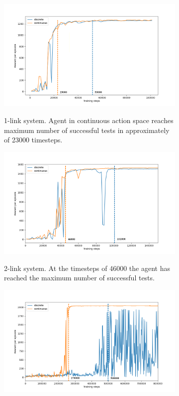 \begin{figure}[h!]
	\centering
	\begin{subfigure}[t]{0.48\textwidth}
		\centering
		\includegraphics[width=\textwidth]{Figures/SP_discrete_vs_continuous_training_time.png}
		\label{fig: sp - training time}
		\caption{1-link system. Agent in continuous action space reaches maximum number of successful tests in approximately of 23000 timesteps.}
	\end{subfigure}
	\hfill
	\begin{subfigure}[t]{0.48\textwidth}
		\centering
		\includegraphics[width=\textwidth]{Figures/DP_discrete_vs_continuous_training_time.png}
		\label{fig: dp - training time}
		\caption{2-link system. At the timesteps of 46000 the agent has reached the maximum number of successful tests.}
	\end{subfigure}
	\begin{subfigure}[t]{0.48\textwidth}
		\centering
		\includegraphics[width=\textwidth]{Figures/TP_discrete_vs_continuous_training_time.png}

\end{subfigure}
\end{figure}
